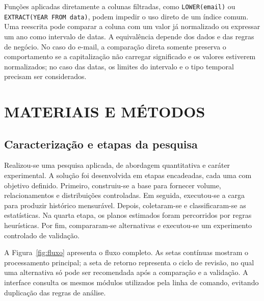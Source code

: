 \documentclass{UNESC}
\newcommand{\codigo}[1]{\texttt{#1}}
\begin{document}
Funções aplicadas diretamente a colunas filtradas, como \codigo{LOWER(email)} ou \codigo{EXTRACT(YEAR FROM data)}, podem impedir o uso direto de um índice comum. Uma reescrita pode comparar a coluna com um valor já normalizado ou expressar um ano como intervalo de datas. A equivalência depende dos dados e das regras de negócio. No caso do e-mail, a comparação direta somente preserva o comportamento se a capitalização não carregar significado e os valores estiverem normalizados; no caso das datas, os limites do intervalo e o tipo temporal precisam ser considerados.

\section{MATERIAIS E MÉTODOS}

\subsection{Caracterização e etapas da pesquisa}

Realizou-se uma pesquisa aplicada, de abordagem quantitativa e caráter experimental. A solução foi desenvolvida em etapas encadeadas, cada uma com objetivo definido. Primeiro, construiu-se a base para fornecer volume, relacionamentos e distribuições controladas. Em seguida, executou-se a carga para produzir histórico mensurável. Depois, coletaram-se e classificaram-se as estatísticas. Na quarta etapa, os planos estimados foram percorridos por regras heurísticas. Por fim, compararam-se alternativas e executou-se um experimento controlado de validação.

A Figura~\ref{fig:fluxo} apresenta o fluxo completo. As setas contínuas mostram o processamento principal; a seta de retorno representa o ciclo de revisão, no qual uma alternativa só pode ser recomendada após a comparação e a validação. A interface consulta os mesmos módulos utilizados pela linha de comando, evitando duplicação das regras de análise.
\end{document}
